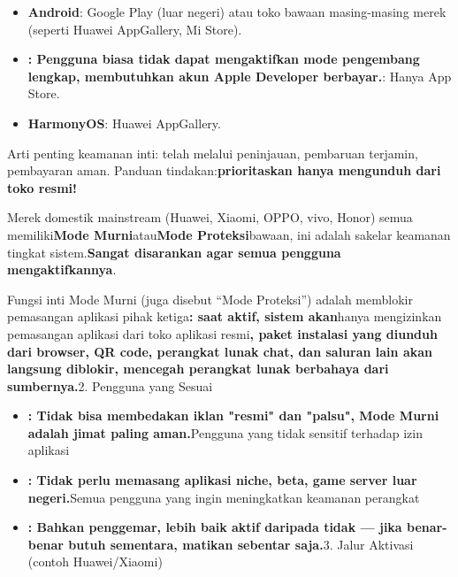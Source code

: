 


\begin{itemize}
  \item \textbf{Android}: Google Play (luar negeri) atau toko bawaan masing-masing merek (seperti Huawei AppGallery, Mi Store).
  \item \textbf{: Pengguna biasa tidak dapat mengaktifkan mode pengembang lengkap, membutuhkan akun Apple Developer berbayar.}: Hanya App Store.
  \item \textbf{HarmonyOS}: Huawei AppGallery.
\end{itemize}

Arti penting keamanan inti: telah melalui peninjauan, pembaruan terjamin, pembayaran aman. Panduan tindakan:\textbf{prioritaskan hanya mengunduh dari toko resmi!}


Merek domestik mainstream (Huawei, Xiaomi, OPPO, vivo, Honor) semua memiliki\textbf{Mode Murni}atau\textbf{Mode Proteksi}bawaan, ini adalah sakelar keamanan tingkat sistem.\textbf{Sangat disarankan agar semua pengguna mengaktifkannya}.


Fungsi inti Mode Murni (juga disebut “Mode Proteksi”) adalah memblokir pemasangan aplikasi pihak ketiga\textbf{: saat aktif, sistem akan}hanya mengizinkan pemasangan aplikasi dari toko aplikasi resmi\textbf{, paket instalasi yang diunduh dari browser, QR code, perangkat lunak chat, dan saluran lain akan langsung diblokir, mencegah perangkat lunak berbahaya dari sumbernya.}2. Pengguna yang Sesuai


\begin{itemize}
  \item \textbf{: Tidak bisa membedakan iklan "resmi" dan "palsu", Mode Murni adalah jimat paling aman.}Pengguna yang tidak sensitif terhadap izin aplikasi
  \item \textbf{: Tidak perlu memasang aplikasi niche, beta, game server luar negeri.}Semua pengguna yang ingin meningkatkan keamanan perangkat
  \item \textbf{: Bahkan penggemar, lebih baik aktif daripada tidak — jika benar-benar butuh sementara, matikan sebentar saja.}3. Jalur Aktivasi (contoh Huawei/Xiaomi)
\end{itemize}

